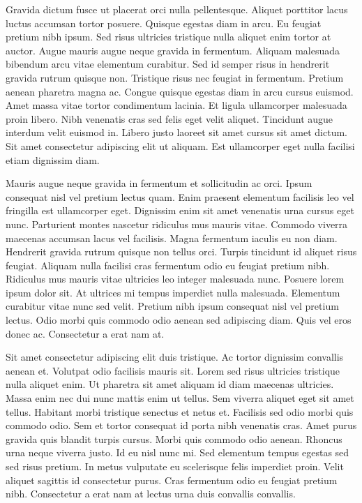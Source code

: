 Gravida dictum fusce ut placerat orci nulla pellentesque. Aliquet 
porttitor lacus luctus accumsan tortor posuere. Quisque egestas diam in 
arcu. Eu feugiat pretium nibh ipsum. Sed risus ultricies tristique nulla
 aliquet enim tortor at auctor. Augue mauris augue neque gravida in 
fermentum. Aliquam malesuada bibendum arcu vitae elementum curabitur. 
Sed id semper risus in hendrerit gravida rutrum quisque non. Tristique 
risus nec feugiat in fermentum. Pretium aenean pharetra magna ac. Congue
 quisque egestas diam in arcu cursus euismod. Amet massa vitae tortor 
condimentum lacinia. Et ligula ullamcorper malesuada proin libero. Nibh 
venenatis cras sed felis eget velit aliquet. Tincidunt augue interdum 
velit euismod in. Libero justo laoreet sit amet cursus sit amet dictum. 
Sit amet consectetur adipiscing elit ut aliquam. Est ullamcorper eget 
nulla facilisi etiam dignissim diam.


Mauris augue neque gravida in fermentum et sollicitudin ac orci. 
Ipsum consequat nisl vel pretium lectus quam. Enim praesent elementum 
facilisis leo vel fringilla est ullamcorper eget. Dignissim enim sit 
amet venenatis urna cursus eget nunc. Parturient montes nascetur 
ridiculus mus mauris vitae. Commodo viverra maecenas accumsan lacus vel 
facilisis. Magna fermentum iaculis eu non diam. Hendrerit gravida rutrum
 quisque non tellus orci. Turpis tincidunt id aliquet risus feugiat. 
Aliquam nulla facilisi cras fermentum odio eu feugiat pretium nibh. 
Ridiculus mus mauris vitae ultricies leo integer malesuada nunc. Posuere
 lorem ipsum dolor sit. At ultrices mi tempus imperdiet nulla malesuada.
 Elementum curabitur vitae nunc sed velit. Pretium nibh ipsum consequat 
nisl vel pretium lectus. Odio morbi quis commodo odio aenean sed 
adipiscing diam. Quis vel eros donec ac. Consectetur a erat nam at.


Sit amet consectetur adipiscing elit duis tristique. Ac tortor 
dignissim convallis aenean et. Volutpat odio facilisis mauris sit. Lorem
 sed risus ultricies tristique nulla aliquet enim. Ut pharetra sit amet 
aliquam id diam maecenas ultricies. Massa enim nec dui nunc mattis enim 
ut tellus. Sem viverra aliquet eget sit amet tellus. Habitant morbi 
tristique senectus et netus et. Facilisis sed odio morbi quis commodo 
odio. Sem et tortor consequat id porta nibh venenatis cras. Amet purus 
gravida quis blandit turpis cursus. Morbi quis commodo odio aenean. 
Rhoncus urna neque viverra justo. Id eu nisl nunc mi. Sed elementum 
tempus egestas sed sed risus pretium. In metus vulputate eu scelerisque 
felis imperdiet proin. Velit aliquet sagittis id consectetur purus. Cras
 fermentum odio eu feugiat pretium nibh. Consectetur a erat nam at 
lectus urna duis convallis convallis.


